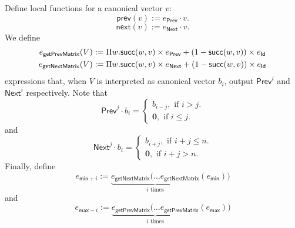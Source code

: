 Define local functions for a canonical vector $v$: 
$$\mathsf{prev}(v):=e_{\mathsf{Prev}}\cdot v.$$
$$\mathsf{next}(v):=e_{\mathsf{Next}}\cdot v.$$
We define
\begin{align*}
    e_{\mathsf{getPrevMatrix}}(V)&:=\Pi w. \mathsf{succ}(w,v)\times e_{\mathsf{Prev}} + (1 - \mathsf{succ}(w,v))\times e_{\mathsf{Id}}\\
    e_{\mathsf{getNextMatrix}}(V)&:=\Pi w. \mathsf{succ}(w,v)\times e_{\mathsf{Next}} + (1 - \mathsf{succ}(w,v))\times e_{\mathsf{Id}}
\end{align*}
expressions that, when $V$ is interpreted as canonical vector $b_i$, output $\mathsf{Prev}^i$ and $\mathsf{Next}^i$ respectively.
Note that
\[
\mathsf{Prev}^j\cdot b_i=\begin{cases}
               b_{i-j}, \text{ if } i > j. \\
              \mathbf{0}, \text{ if } i \leq j.
            \end{cases}
\]
and
\[
\mathsf{Next}^j\cdot b_i=\begin{cases}
               b_{i+j}, \text{ if } i + j \leq n. \\
              \mathbf{0}, \text{ if } i + j > n.
            \end{cases}
\]
Finally, define
$$
e_{\mathsf{min}+i}:=\underbrace{e_{\mathsf{getNextMatrix}}(\ldots e_{\mathsf{getNextMatrix}}}_{i \text{ times}}(e_{\mathsf{min}}))
$$
and
$$
e_{\mathsf{max}-i}:=\underbrace{e_{\mathsf{getPrevMatrix}}(\ldots e_{\mathsf{getPrevMatrix}}}_{i \text{ times}}(e_{\mathsf{max}}))
$$